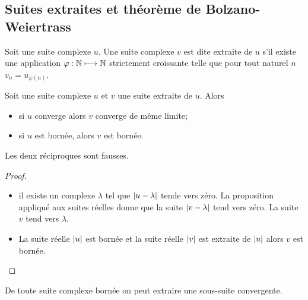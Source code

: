         \subsection{Suites extraites et théorème de Bolzano-Weiertrass}
        \begin{defdef}
          Soit une suite complexe \(u\). Une suite complexe \(v\) est dite 
          extraite de \(u\) s'il existe une application \(\varphi:\mathbb{N} \longmapsto 
          \mathbb{N}\) strictement croissante telle que pour tout naturel \(n\) \(v_n = 
          u_{\varphi(n)}\).
        \end{defdef}
        \begin{prop}
          Soit une suite complexe \(u\) et \(v\) une suite extraite de \(u\). 
          Alors
          \begin{itemize}
            \item si \(u\) converge alors \(v\) converge de même limite;
            \item si \(u\) est bornée, alors \(v\) est bornée.
          \end{itemize}
          Les deux réciproques sont fausses.
        \end{prop}
        \begin{proof}
          \begin{itemize}
            \item il existe un complexe \(\lambda\) tel que \(\left\lvert u-\lambda\right\rvert\) 
              tende vers zéro. La proposition appliqué aux suites réelles donne 
              que la suite \(\left\lvert v-\lambda\right\rvert\) tend vers zéro. La suite \(v\) 
              tend vers \(\lambda\).
            \item La suite réelle \(\left\lvert u\right\rvert\) est bornée et la suite réelle 
              \(\left\lvert v\right\rvert\) est extraite de \(\left\lvert u\right\rvert\) alors \(v\) est bornée.
          \end{itemize}
        \end{proof}
        \begin{theo}
          De toute suite complexe bornée on peut extraire une sous-suite 
          convergente.
        \end{theo}

